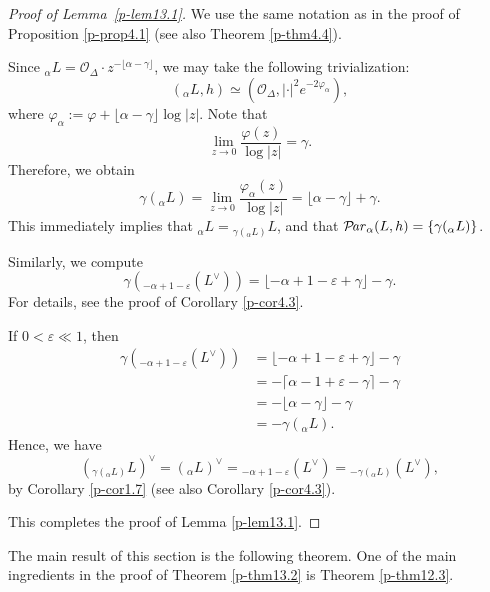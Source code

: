 \documentclass[12pt,twoside]{amsart}
\DeclareMathOperator{\Par}{\mathcal{P}\!\it{ar}}
\theoremstyle{definition}
\begin{document}
\begin{proof}[Proof of Lemma~\ref{p-lem13.1}]
We use the same notation as in the 
proof of Proposition \ref{p-prop4.1} (see also Theorem \ref{p-thm4.4}).  

Since ${}_\alpha L = \mathcal{O}_\Delta \cdot z^{-\lfloor \alpha - \gamma \rfloor}$, 
we may take the following trivialization: 
\[
({}_\alpha L, h) \simeq 
\left( \mathcal{O}_\Delta, 
|\cdot|^2 e^{-2\varphi_\alpha} \right),
\] 
where $\varphi_\alpha := \varphi + \lfloor \alpha - \gamma \rfloor \log |z|$. 
Note that 
\[
\lim_{z \to 0} \frac{\varphi(z)}{\log |z|} = \gamma. 
\]
Therefore, we obtain
\[
\gamma({}_\alpha L) 
= \lim_{z \to 0} \frac{\varphi_\alpha(z)}{\log |z|} 
= \lfloor \alpha - \gamma \rfloor + \gamma.
\] 
This immediately implies that ${}_\alpha L = {}_{\gamma({}_\alpha L)} L$, 
and that $\Par_\alpha (L, h) = \{ \gamma({}_\alpha L) \}$.

Similarly, we compute
\[
\gamma \left({}_{-\alpha + 1 - \varepsilon}(L^\vee)\right) 
= \lfloor -\alpha + 1 - \varepsilon + \gamma \rfloor - \gamma.
\] 
For details, see the proof of Corollary \ref{p-cor4.3}.   

If $0 < \varepsilon \ll 1$, then
\begin{equation*}
\begin{split}
\gamma({}_{-\alpha + 1 - \varepsilon}(L^\vee)) 
&= \lfloor -\alpha + 1 - \varepsilon + \gamma \rfloor - \gamma \\
&= -\lceil \alpha - 1 + \varepsilon - \gamma \rceil - \gamma \\
&= -\lfloor \alpha - \gamma \rfloor - \gamma \\
&= -\gamma({}_\alpha L).
\end{split}
\end{equation*}
Hence, we have
\[
\left({}_{\gamma({}_\alpha L)} L\right)^\vee 
= \left({}_\alpha L\right)^\vee 
= {}_{-\alpha + 1 - \varepsilon}(L^\vee) 
= {}_{-\gamma({}_\alpha L)}(L^\vee),
\] 
by Corollary \ref{p-cor1.7} (see also Corollary \ref{p-cor4.3}). 

This completes the proof of Lemma \ref{p-lem13.1}.
\end{proof}

The main result of this section is the following theorem.  
One of the main ingredients in the proof of 
Theorem \ref{p-thm13.2} is Theorem \ref{p-thm12.3}.
\end{document}
